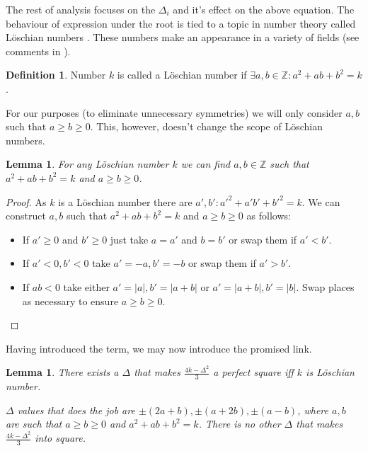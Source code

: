 \documentclass{article}
\theoremstyle{plain}
\newtheorem{lemma}[theorem]{Lemma}
\theoremstyle{definition}
\newtheorem{definition}[theorem]{Definition}
\theoremstyle{remark}
\begin{document}
		The rest of analysis focuses on the $\Delta_i$ and it's effect on the above equation. The behaviour of expression under the root is tied to a topic in number theory called Löschian numbers \cite{oeisA003136}. These numbers make an appearance in a variety of fields (see comments in \cite{oeisA003136}).
		
		\begin{definition}
			\label{v3:def:loeshian}
			Number $k$ is called a Löschian number if $\exists a,b \in \mathbb Z \colon a^2+ab+b^2=k$.
		\end{definition}
		
		For our purposes (to eliminate unnecessary symmetries) we will only consider $a,b$ such that $a \geq b \geq 0$. This, however, doesn't change the scope of Löschian numbers.
		
		\begin{lemma}
			\label{v3:lemma:loeschian}
			For any Löschian number $k$ we can find $a,b \in \mathbb Z$ such that $a^2+ab+b^2=k$ and $a \geq b \geq 0$.
		\end{lemma}
		
		\begin{proof}
			As $k$ is a Löschian number there are $a',b' \colon a'^2+a'b'+b'^2=k$. We can construct $a,b$ such that $a^2+ab+b^2=k$ and $a \geq b \geq 0$ as follows:
			\begin{itemize}
				\item If $a' \geq 0$ and $b' \geq 0$ just take $a=a'$ and $b=b'$ or swap them if $a'<b'$.
				\item If $a'<0,b'<0$ take $a'=-a,b'=-b$ or swap them if $a'>b'$.
				\item If $ab<0$ take either $a'=|a|, b'=|a+b|$ or $a'=|a+b|, b'=|b|$. Swap places as necessary to ensure $a \geq b \geq 0$.
			\end{itemize}
		\end{proof}
		
		Having introduced the term, we may now introduce the promised link.
		
		\begin{lemma}
			\label{v3:lemma:square}
			There exists a $\Delta$ that makes $\frac{4k-\Delta^2}{3}$ a perfect square iff $k$ is Löschian number.
			
			$\Delta$ values that does the job are $\pm (2a+b), \pm (a+2b), \pm (a-b)$, where $a,b$ are such that $a \geq b \geq 0$ and $a^2+ab+b^2=k$. There is no other $\Delta$ that makes $\frac{4k-\Delta^2}{3}$ into square.
		\end{lemma}
		
\end{document}
